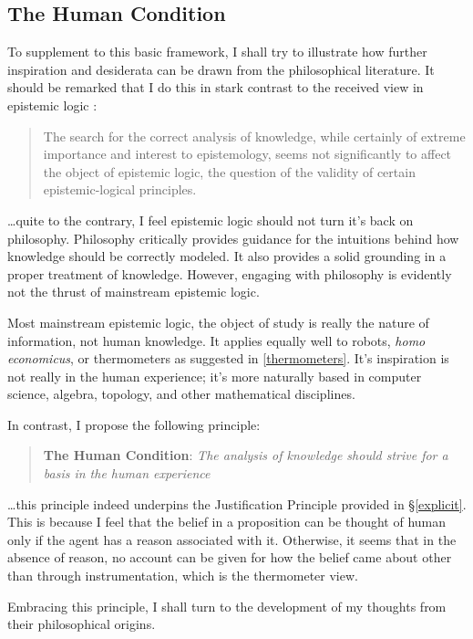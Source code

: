 \documentclass[11pt]{article}
\numberwithin{equation}{subsection}
\begin{document}
\subsection{The Human Condition}\label{Human-Condition}
To supplement to this basic framework, I shall try to illustrate how further inspiration and desiderata can be drawn from the philosophical literature.  It should be remarked that I do this in stark contrast to the received view in epistemic logic \citep[pg. 34]{lenzen_recent_1978}:
\begin{quote}
The search for the correct analysis of knowledge, while certainly of extreme importance and interest to epistemology, seems not significantly to affect the object of epistemic logic, the question of the validity of certain epistemic-logical principles.
\end{quote}
\ldots quite to the contrary, I feel epistemic logic should not turn it's back on philosophy. Philosophy critically provides guidance for the intuitions behind how knowledge should be correctly modeled.  It also provides a solid grounding in a proper treatment of knowledge.  However, engaging with philosophy is evidently not the thrust of mainstream epistemic logic.

Most mainstream epistemic logic, the object of study is really the nature of information, not human knowledge.  It applies equally well to robots, \emph{homo economicus}, or thermometers as suggested in \ref{thermometers}.  It's inspiration is not really in the human experience; it's more naturally based in computer science, algebra, topology, and other mathematical disciplines.

In contrast, I propose the following principle:
\begin{quote}
 \textbf{The Human Condition}: \emph{The analysis of knowledge should strive for a basis in the human experience}
\end{quote}
\ldots this principle indeed underpins the Justification Principle provided in \S\ref{explicit}. This is because I feel that the belief in a proposition can be thought of human only if the agent has a reason associated with it.  Otherwise, it seems that in the absence of reason, no account can be given for how the belief came about other than through instrumentation, which is the thermometer view.

Embracing this principle, I shall turn to the development of my thoughts from their philosophical origins.
\end{document}
